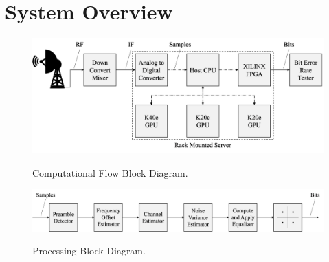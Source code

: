 

\chapter{System Overview}
\label{sec:systemOverview}






\begin{figure}
	\centering\includegraphics[width=11.25in/100*55]{figures/systemOverview/ComputationalFlowBlock.pdf}
	\label{fig:ComputationalFlowBlock}
		\caption{Computational Flow Block Diagram.}
\end{figure}
\clearpage
\begin{figure}
	\centering\includegraphics[width=12.89in/100*55]{figures/systemOverview/ProcessingBlock_new.pdf}
	\label{fig:ProcessingBlock_new}
	\caption{Processing Block Diagram.}
\end{figure}
